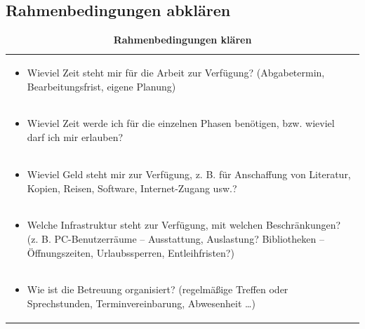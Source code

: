 \documentclass[]{book}
\providecommand{\tightlist}{%
  \setlength{\itemsep}{0pt}\setlength{\parskip}{0pt}}
\theoremstyle{definition}
\theoremstyle{definition}
\theoremstyle{definition}
\theoremstyle{remark}
\begin{document}
\subsection{Rahmenbedingungen
abklären}\label{rahmenbedingungen-abklaren}

\begin{longtable}[]{@{}l@{}}
\caption{\textbf{\label{tab:rahmenbedingungen} Rahmenbedingungen
klären}}\tabularnewline
\toprule
\begin{minipage}[t]{0.97\columnwidth}\raggedright\strut
\begin{itemize}
\tightlist
\item
  Wieviel Zeit steht mir für die Arbeit zur Verfügung? (Abgabetermin,
  Bearbeitungsfrist, eigene Planung) \vspace{-6mm}
\end{itemize}\strut
\end{minipage}\tabularnewline
\begin{minipage}[t]{0.97\columnwidth}\raggedright\strut
\begin{itemize}
\tightlist
\item
  Wieviel Zeit werde ich für die einzelnen Phasen benötigen, bzw.
  wieviel darf ich mir erlauben? \vspace{-6mm}
\end{itemize}\strut
\end{minipage}\tabularnewline
\begin{minipage}[t]{0.97\columnwidth}\raggedright\strut
\begin{itemize}
\tightlist
\item
  Wieviel Geld steht mir zur Verfügung, z. B. für Anschaffung von
  Literatur, Kopien, Reisen, Software, Internet-Zugang usw.?
  \vspace{-6mm}
\end{itemize}\strut
\end{minipage}\tabularnewline
\begin{minipage}[t]{0.97\columnwidth}\raggedright\strut
\begin{itemize}
\tightlist
\item
  Welche Infrastruktur steht zur Verfügung, mit welchen Beschränkungen?
  (z. B. PC-Benutzerräume -- Ausstattung, Auslastung? Bibliotheken --
  Öffnungszeiten, Urlaubssperren, Entleihfristen?) \vspace{-6mm}
\end{itemize}\strut
\end{minipage}\tabularnewline
\begin{minipage}[t]{0.97\columnwidth}\raggedright\strut
\begin{itemize}
\tightlist
\item
  Wie ist die Betreuung organisiert? (regelmäßige Treffen oder
  Sprechstunden, Terminvereinbarung, Abwesenheit \ldots{})
\end{itemize}\strut
\end{minipage}\tabularnewline
\bottomrule
\end{longtable}
\end{document}
